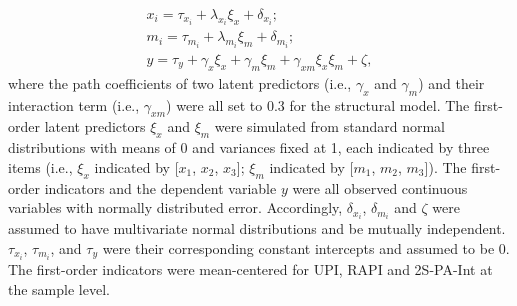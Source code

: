 \documentclass[
  man]{apa6}
\begin{document}
\begin{equation}
\begin{gathered}
x_{i} =  \tau_{x_{i}} + \lambda_{x_{i}}\xi_{x} + \delta_{x_{i}};\\
m_{i} =  \tau_{m_{i}} + \lambda_{m_{i}}\xi_{m} + \delta_{m_{i}};\\
y =  \tau_{y} + \gamma_{x}\xi_{x} + \gamma_{m}\xi_{m} + \gamma_{xm}\xi_{x}\xi_{m} + \zeta,
\end{gathered}
\end{equation}
where the path coefficients of two latent predictors (i.e., \(\gamma_{x}\) and \(\gamma_{m}\)) and their interaction term (i.e., \(\gamma_{xm}\)) were all set to 0.3 for the structural model. The first-order latent predictors \(\xi_{x}\) and \(\xi_{m}\) were simulated from standard normal distributions with means of 0 and variances fixed at 1, each indicated by three items (i.e., \(\xi_{x}\) indicated by {[}\(x_{1}\), \(x_{2}\), \(x_{3}\){]}; \(\xi_{m}\) indicated by {[}\(m_{1}\), \(m_{2}\), \(m_{3}\){]}). The first-order indicators and the dependent variable \(y\) were all observed continuous variables with normally distributed error. Accordingly, \(\delta_{x_{i}}\), \(\delta_{m_{i}}\) and \(\zeta\) were assumed to have multivariate normal distributions and be mutually independent. \(\tau_{x_{i}}\), \(\tau_{m_{i}}\), and \(\tau_{y}\) were their corresponding constant intercepts and assumed to be 0. The first-order indicators were mean-centered for UPI, RAPI and 2S-PA-Int at the sample level.
\end{document}
